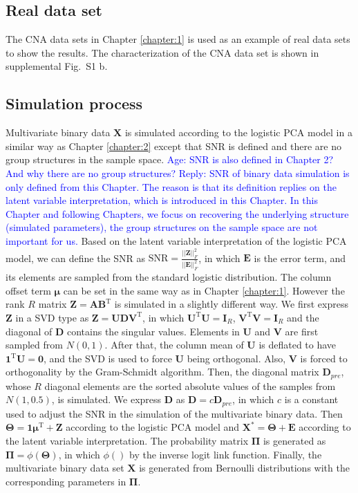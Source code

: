 \subsection{Real data set}
The CNA data sets in Chapter \ref{chapter:1} is used as an example of real data sets to show the results. The characterization of the CNA data set is shown in supplemental Fig.~S1 b.

\subsection{Simulation process}
Multivariate binary data $\mathbf{X}$ is simulated according to the logistic PCA model in a similar way as Chapter \ref{chapter:2} except that SNR is defined and there are no group structures in the sample space. \textcolor{blue}{Age: SNR is also defined in Chapter 2? And why there are no group structures? Reply: SNR of binary data simulation is only defined from this Chapter. The reason is that its definition replies on the latent variable interpretation, which is introduced in this Chapter. In this Chapter and following Chapters, we focus on recovering the underlying structure (simulated parameters), the group structures on the sample space are not important for us.} Based on the latent variable interpretation of the logistic PCA model, we can define the SNR as $\text{SNR}=\frac{||\mathbf{Z}||_F^2}{||\mathbf{E}||_F^2}$, in which $\mathbf{E}$ is the error term, and its elements are sampled from the standard logistic distribution. The column offset term $\bm{\mu}$ can be set in the same way as in Chapter \ref{chapter:1}. However the rank $R$ matrix $\mathbf{Z}=\mathbf{AB}^{\text{T}}$ is simulated in a slightly different way. We first express $\mathbf{Z}$ in a SVD type as $\mathbf{Z}= \mathbf{UDV}^{\text{T}}$, in which $\mathbf{U}^{\text{T}}\mathbf{U} = \mathbf{I}_{R}$, $\mathbf{V}^{\text{T}}\mathbf{V} = \mathbf{I}_{R}$ and the diagonal of $\mathbf{D}$ contains the singular values. Elements in $\mathbf{U}$ and $\mathbf{V}$ are first sampled from $N(0,1)$. After that, the column mean of $\mathbf{U}$ is deflated to have $\mathbf{1}^{\text{T}}\mathbf{U}=\mathbf{0}$, and the SVD is used to force $\mathbf{U}$ being orthogonal. Also, $\mathbf{V}$ is forced to orthogonality by the Gram-Schmidt algorithm. Then, the diagonal matrix $\mathbf{D}_{pre}$, whose $R$ diagonal elements are the sorted absolute values of the samples from $N(1,0.5)$, is simulated. We express $\mathbf{D}$ as $\mathbf{D} = c\mathbf{D}_{pre}$, in which $c$ is a constant used to adjust the SNR in the simulation of the multivariate binary data. Then $\mathbf{\Theta} = \mathbf{1}\bm{\mu}^{\text{T}} + \mathbf{Z}$ according to the logistic PCA model and $\mathbf{X}^{\ast} = \mathbf{\Theta} + \mathbf{E}$ according to the latent variable interpretation. The probability matrix $\mathbf{\Pi}$ is generated as $\mathbf{\Pi} = \phi(\mathbf{\Theta})$, in which $\phi()$ by the inverse logit link function. Finally, the multivariate binary data set $\mathbf{X}$ is generated from Bernoulli distributions with the corresponding parameters in $\mathbf{\Pi}$.

